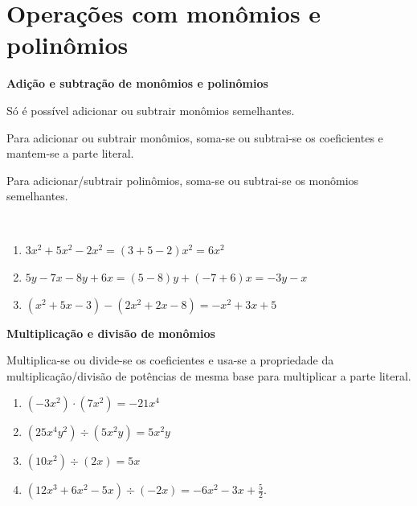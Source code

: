 \section{Operações com monômios e polinômios}

\begin{caixa}

    \textbf{Adição e subtração de monômios e polinômios}
    
    \vspace{5mm}
    
    Só é possível adicionar ou subtrair monômios semelhantes.\\
    
    \vspace{5mm}
    
    Para adicionar ou subtrair monômios, soma-se ou subtrai-se os coeficientes e mantem-se a parte literal.\\
    
    \vspace{5mm}
    
    Para adicionar/subtrair polinômios, soma-se ou subtrai-se os monômios semelhantes.\\
    
\end{caixa}

\begin{texemplo}\
\begin{enumerate}[label=(\alph*)]
    \item $3x^2 + 5x^2 - 2x^2 = (3+5-2)x^2 = 6x^2$
    \item $5y - 7x - 8y + 6x = (5-8)y + (-7+6)x = -3y - x$
    \item $(x^2 + 5x -3) - ( 2x^2 + 2x -8) = -x^2 + 3x + 5$
\end{enumerate}
\end{texemplo}

\begin{caixa}

    \textbf{Multiplicação e divisão de monômios}
    
    \vspace{5mm}
    
    Multiplica-se ou divide-se os coeficientes e usa-se a propriedade da multiplicação/divisão de potências de mesma base para multiplicar a parte literal.
    
\end{caixa}

\begin{texemplo}
\begin{enumerate}[label=(\alph*)]
    \item $(-3x^2 ) \cdot (7x^2) = -21x^4$
    \item $(25x^4 y^2) \div (5x^2 y) = 5x^2y$
    \item $(10x^2) \div (2x) = 5x$
    \item $(12x^3 + 6x^2 - 5x) \div (-2x) = -6x^2 - 3x + \frac{5}{2}$.   
\end{enumerate}
\end{texemplo}

